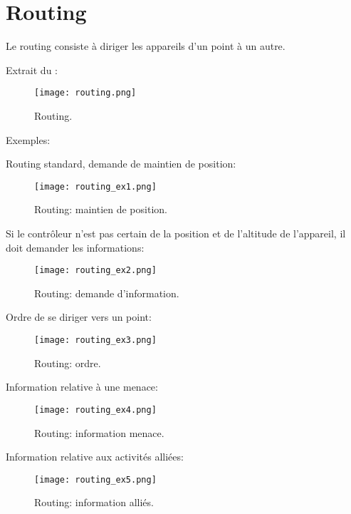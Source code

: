\section{Routing}
\e
    \item Le routing consiste à diriger les appareils d’un point à un autre.
    \item Extrait du \jp:\\
    \begin{figure}[H]
        \texttt{[image: routing.png]}
        \caption{Routing.}
        \label{fig:routing}
    \end{figure}
    \item Exemples:\\
    \ee
        \item Routing standard, demande de maintien de position:\\
        \begin{figure}[H]
            \texttt{[image: routing\_ex1.png]}
            \caption{Routing: maintien de position.}
            \label{fig:routingpos}
        \end{figure}
        \item Si le contrôleur n'est pas certain de la position et de l'altitude de l'appareil, il doit demander les informations:\\
        \begin{figure}[H]
            \texttt{[image: routing\_ex2.png]}
            \caption{Routing: demande d'information.}
            \label{fig:routinginfo}
        \end{figure}
        \item Ordre de se diriger vers un point:\\
        \begin{figure}[H]
            \texttt{[image: routing\_ex3.png]}
            \caption{Routing: ordre.}
            \label{fig:routingorder}
        \end{figure}
        \item Information relative à une menace:\\
        \begin{figure}[H]
            \texttt{[image: routing\_ex4.png]}
            \caption{Routing: information menace.}
            \label{fig:routingthreat}
        \end{figure}
        \item Information relative aux activités alliées:\\
        \begin{figure}[H]
            \texttt{[image: routing\_ex5.png]}
            \caption{Routing: information alliés.}
            \label{fig:routingallies}
        \end{figure}
    \ed
\ed

